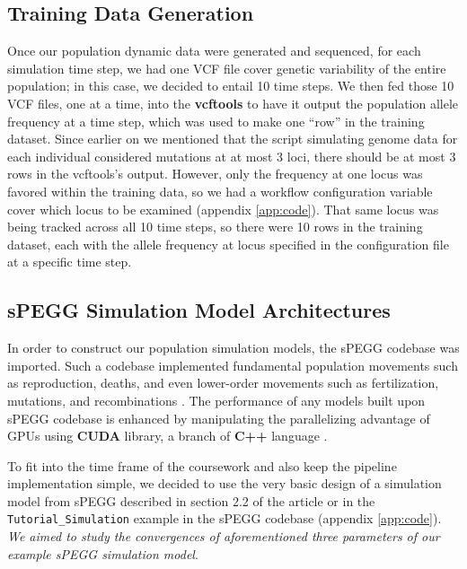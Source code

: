 \documentclass[12pt]{article}
\begin{document}
\subsection{Training Data Generation}

Once our population dynamic data were generated and sequenced, for each simulation time step, we had one VCF file cover genetic variability of the entire population; in this case, we decided to entail 10 time steps. We then fed those 10 VCF files, one at a time, into the \textbf{vcftools} to have it output the population allele frequency at a time step, which was used to make one \enquote{row} in the training dataset. Since earlier on we mentioned that the script simulating genome data for each individual considered mutations at at most 3 loci, there should be at most 3 rows in the vcftools's output. However, only the frequency at one locus was favored within the training data, so we had a workflow configuration variable cover which locus to be examined (appendix \ref{app:code}). That same locus was being tracked across all 10 time steps, so there were 10 rows in the training dataset, each with the allele frequency at locus specified in the configuration file at a specific time step.

\subsection{sPEGG Simulation Model Architectures}

In order to construct our population simulation models, the sPEGG codebase was imported. Such a codebase implemented fundamental population movements such as reproduction, deaths, and even lower-order movements such as fertilization, mutations, and recombinations \cite{okamoto2018}. The performance of any models built upon sPEGG codebase is enhanced by manipulating the parallelizing advantage of GPUs using \textbf{CUDA} library, a branch of \textbf{C++} language \cite{cuda2008}.

To fit into the time frame of the coursework and also keep the pipeline implementation simple, we decided to use the very basic design of a simulation model from sPEGG described in section 2.2 of the article \cite{okamoto2018} or in the \texttt{Tutorial\_Simulation} example in the sPEGG codebase (appendix \ref{app:code}). \emph{We aimed to study the convergences of aforementioned three parameters of our example sPEGG simulation model}.
\end{document}
